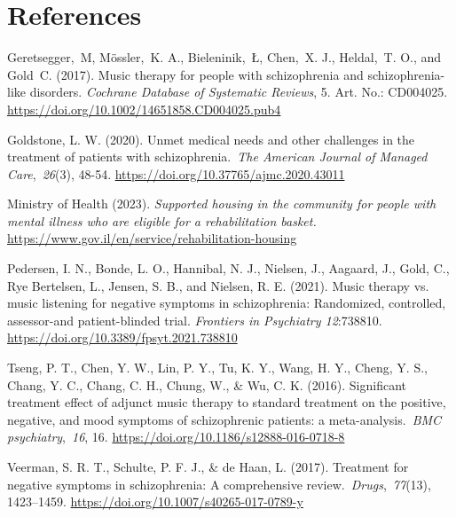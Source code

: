 \documentclass[authordate, empirical]{jote-new-article}
\begin{document}
\section{References}



Geretsegger, M, Mössler, K. A., Bieleninik, Ł, Chen, X. J., Heldal, T. O., and Gold C. (2017). Music therapy for people with schizophrenia and schizophrenia-like disorders.\emph{ Cochrane Database of Systematic Reviews}, 5. Art. No.: CD004025. \href{https://doi.org/10.1002/14651858.CD004025.pub4}{https://doi.org/10.1002/14651858.CD004025.pub4}



Goldstone, L. W. (2020). Unmet medical needs and other challenges in the treatment of patients with schizophrenia. \emph{The American Journal of Managed Care}, \emph{26}(3), 48-54. \href{https://doi.org/10.37765/ajmc.2020.43011}{https://doi.org/10.37765/ajmc.2020.43011}



Ministry of Health (2023). \emph{Supported housing in the community for people with mental illness who are eligible for a rehabilitation basket. }\href{https://www.gov.il/en/service/rehabilitation-housing}{https://www.gov.il/en/service/rehabilitation-housing}



Pedersen, I. N., Bonde, L. O., Hannibal, N. J., Nielsen, J., Aagaard, J., Gold, C., Rye Bertelsen, L., Jensen, S. B., and Nielsen, R. E. (2021). Music therapy vs. music listening for negative symptoms in schizophrenia: Randomized, controlled, assessor-and patient-blinded trial. \emph{Frontiers in Psychiatry 12}:738810. \href{https://doi.org/10.3389/fpsyt.2021.738810}{https://doi.org/10.3389/fpsyt.2021.738810}



Tseng, P. T., Chen, Y. W., Lin, P. Y., Tu, K. Y., Wang, H. Y., Cheng, Y. S., Chang, Y. C., Chang, C. H., Chung, W., \& Wu, C. K. (2016). Significant treatment effect of adjunct music therapy to standard treatment on the positive, negative, and mood symptoms of schizophrenic patients: a meta-analysis. \emph{BMC psychiatry}, \emph{16}, 16. \href{https://doi.org/10.1186/s12888-016-0718-8}{https://doi.org/10.1186/s12888-016-0718-8}



Veerman, S. R. T., Schulte, P. F. J., \& de Haan, L. (2017). Treatment for negative symptoms in schizophrenia: A comprehensive review. \emph{Drugs}, \emph{77}(13), 1423--1459. \href{https://doi.org/10.1007/s40265-017-0789-y}{https://doi.org/10.1007/s40265-017-0789-y}
\end{document}

